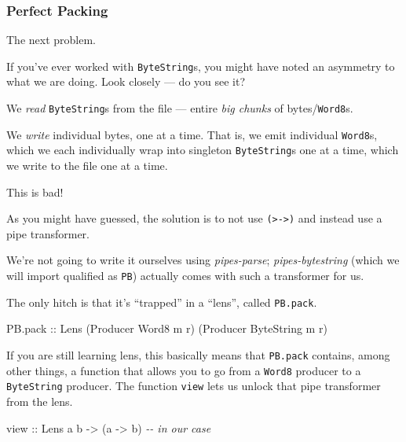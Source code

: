 \documentclass[]{article}
\newenvironment{Shaded}{}{}
\newcommand{\CommentTok}[1]{\textcolor[rgb]{0.38,0.63,0.69}{\textit{#1}}}
\newcommand{\DataTypeTok}[1]{\textcolor[rgb]{0.56,0.13,0.00}{#1}}
\newcommand{\NormalTok}[1]{#1}
\newcommand{\OtherTok}[1]{\textcolor[rgb]{0.00,0.44,0.13}{#1}}
\begin{document}
\subsubsection{Perfect Packing}\label{perfect-packing}

The next problem.

If you've ever worked with \texttt{ByteString}s, you might have noted an
asymmetry to what we are doing. Look closely --- do you see it?

We \emph{read} \texttt{ByteString}s from the file --- entire \emph{big chunks}
of bytes/\texttt{Word8}s.

We \emph{write} individual bytes, one at a time. That is, we emit individual
\texttt{Word8}s, which we each individually wrap into singleton
\texttt{ByteString}s one at a time, which we write to the file one at a time.

This is bad!

As you might have guessed, the solution is to not use
\texttt{(\textgreater{}-\textgreater{})} and instead use a pipe transformer.

We're not going to write it ourselves using \emph{pipes-parse};
\emph{pipes-bytestring} (which we will import qualified as \texttt{PB}) actually
comes with such a transformer for us.

The only hitch is that it's ``trapped'' in a ``lens'', called \texttt{PB.pack}.

\begin{Shaded}
\begin{Highlighting}[]
\NormalTok{PB.pack}\OtherTok{ ::} \DataTypeTok{Lens\textquotesingle{}}\NormalTok{ (}\DataTypeTok{Producer} \DataTypeTok{Word8}\NormalTok{ m r) (}\DataTypeTok{Producer} \DataTypeTok{ByteString}\NormalTok{ m r)}
\end{Highlighting}
\end{Shaded}

If you are still learning lens, this basically means that \texttt{PB.pack}
contains, among other things, a function that allows you to go from a
\texttt{Word8} producer to a \texttt{ByteString} producer. The function
\texttt{view} lets us unlock that pipe transformer from the lens.

\begin{Shaded}
\begin{Highlighting}[]
\OtherTok{view ::} \DataTypeTok{Lens\textquotesingle{}}\NormalTok{ a b }\OtherTok{{-}\textgreater{}}\NormalTok{ (a }\OtherTok{{-}\textgreater{}}\NormalTok{ b)       }\CommentTok{{-}{-} in our case}
\end{Highlighting}
\end{Shaded}
\end{document}
